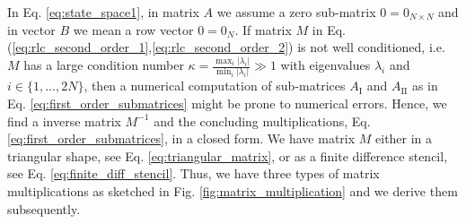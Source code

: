 In Eq. \eqref{eq:state_space1}, in matrix $A$ we assume a zero sub-matrix $0 = 0_{N\times N}$ and in vector $B$ we mean a row vector $0 = 0_{N}$.
If matrix $M$ in Eq. (\ref{eq:rlc_second_order_1},\ref{eq:rlc_second_order_2}) is not well conditioned, i.e. $M$ has a large condition number $\kappa = \frac{\max_{i} |\lambda_{i}|}{\min_{i} |\lambda_{i}|} \gg 1$ with eigenvalues $\lambda_{i}$ and $i \in \{1,\ldots,2N\}$, then a numerical computation of sub-matrices $A_{\mathrm{I}}$ and $A_{\mathrm{II}}$ as in Eq. \eqref{eq:first_order_submatrices} might be prone to numerical errors. Hence, we find a inverse matrix $M^{-1}$ and the concluding multiplications, Eq. \eqref{eq:first_order_submatrices}, in a closed form. We have matrix $M$ either in a triangular shape, see Eq. \eqref{eq:triangular_matrix}, or as a finite difference stencil, see Eq. \eqref{eq:finite_diff_stencil}. Thus, we have three types of matrix multiplications as sketched in  Fig. \ref{fig:matrix_multiplication} and we derive them subsequently.



